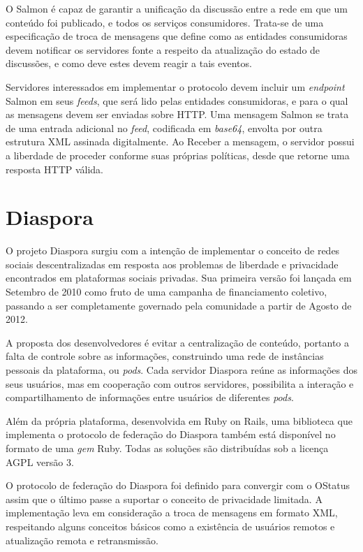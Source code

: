 O Salmon é capaz de garantir a unificação da discussão entre a rede em que um
conteúdo foi publicado, e todos os serviços consumidores. Trata-se de uma 
especificação de troca de mensagens que define como as entidades consumidoras devem 
notificar os servidores fonte a respeito da atualização do estado de discussões, e 
como deve estes devem reagir a tais eventos.

Servidores interessados em implementar o protocolo devem incluir um 
\textit{endpoint} Salmon em seus \textit{feeds}, que será lido pelas entidades
consumidoras, e para o qual as mensagens devem ser enviadas sobre HTTP. Uma mensagem
Salmon se trata de uma entrada adicional no \textit{feed}, codificada em 
\textit{base64}, envolta por outra estrutura XML assinada digitalmente. Ao Receber a
mensagem, o servidor possui a liberdade de proceder conforme suas próprias 
políticas, desde que retorne uma resposta HTTP válida.

\section{Diaspora}

O projeto Diaspora surgiu com a intenção de implementar o conceito de redes sociais
descentralizadas em resposta aos problemas de liberdade e privacidade encontrados
em plataformas sociais privadas. Sua primeira versão foi lançada em Setembro de 2010
como fruto de uma campanha de financiamento coletivo, passando a ser completamente
governado pela comunidade a partir de Agosto de 2012.


A proposta dos desenvolvedores é evitar a centralização de conteúdo, portanto a 
falta de controle sobre as informações, construindo uma rede de instâncias pessoais
da plataforma, ou \textit{pods}. Cada servidor Diaspora reúne as informações dos 
seus usuários, mas em cooperação com outros servidores, possibilita a interação
e compartilhamento de informações entre usuários de diferentes \textit{pods}.

Além da própria plataforma, desenvolvida em Ruby on Rails, uma biblioteca que
implementa o protocolo de federação do Diaspora também está disponível no formato
de uma \textit{gem} Ruby. Todas as soluções são distribuídas sob a licença AGPL 
versão 3. 

O protocolo de federação do Diaspora foi definido para convergir com o OStatus
assim que o último passe a suportar o conceito de privacidade limitada. A
implementação leva em consideração a troca de mensagens em formato XML, respeitando
alguns conceitos básicos como a existência de usuários remotos e atualização remota
e retransmissão.

